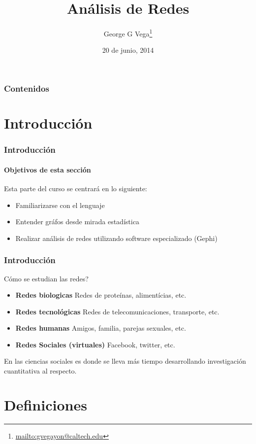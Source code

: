 \documentclass{beamer}
\author{George G Vega\thanks{\url{mailto:gvegayon@caltech.edu}}}
\institute{Superintendencia de Pensiones}
\title{An\'alisis de Redes}
\date{20 de junio, 2014}
\begin{document}
\frame{\maketitle}

\begin{frame}
\frametitle{Contenidos}
\tableofcontents
\end{frame}

\section{Introducci\'on}

\begin{frame}
\frametitle{Introducci\'on}
\framesubtitle{Objetivos de esta secci\'on}

Esta parte del curso se centrar\'a en lo siguiente:

\begin{itemize}
\item Familiarizarse con el lenguaje
\item Entender gr\'afos desde mirada estad\'istica
\item Realizar an\'alisis de redes utilizando software especializado (Gephi)
\end{itemize}

\end{frame}

\begin{frame}
\frametitle{Introducci\'on}

C\'omo se estudian las redes?

\begin{itemize}
\item {\bf Redes biologicas} Redes de prote\'inas, aliment\'icias, etc.
\item {\bf Redes tecnol\'ogicas} Redes de telecomunicaciones, transporte, etc.
\item {\bf Redes humanas} Amigos, familia, parejas sexuales, etc.
\item {\bf Redes Sociales (virtuales)} Facebook, twitter, etc.
\end{itemize}

En las ciencias sociales es donde se lleva m\'as tiempo desarrollando investigaci\'on
cuantitativa al respecto.

\end{frame}

\section{Definiciones}
\end{document}
